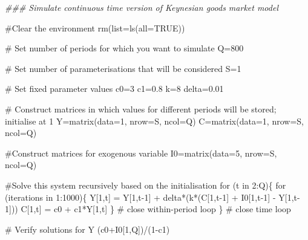 \documentclass[
  letterpaper,
  DIV=11,
  numbers=noendperiod]{scrreprt}
\newenvironment{Shaded}{\begin{snugshade}}{\end{snugshade}}
\newcommand{\AttributeTok}[1]{\textcolor[rgb]{0.40,0.45,0.13}{#1}}
\newcommand{\CommentTok}[1]{\textcolor[rgb]{0.37,0.37,0.37}{#1}}
\newcommand{\ConstantTok}[1]{\textcolor[rgb]{0.56,0.35,0.01}{#1}}
\newcommand{\ControlFlowTok}[1]{\textcolor[rgb]{0.00,0.23,0.31}{#1}}
\newcommand{\DecValTok}[1]{\textcolor[rgb]{0.68,0.00,0.00}{#1}}
\newcommand{\DocumentationTok}[1]{\textcolor[rgb]{0.37,0.37,0.37}{\textit{#1}}}
\newcommand{\FloatTok}[1]{\textcolor[rgb]{0.68,0.00,0.00}{#1}}
\newcommand{\FunctionTok}[1]{\textcolor[rgb]{0.28,0.35,0.67}{#1}}
\newcommand{\NormalTok}[1]{\textcolor[rgb]{0.00,0.23,0.31}{#1}}
\newcommand{\OtherTok}[1]{\textcolor[rgb]{0.00,0.23,0.31}{#1}}
\newcommand{\SpecialCharTok}[1]{\textcolor[rgb]{0.37,0.37,0.37}{#1}}
\begin{document}
\begin{Shaded}
\begin{Highlighting}[]
\DocumentationTok{\#\#\# Simulate continuous time version of Keynesian goods market model}

\CommentTok{\#Clear the environment }
\FunctionTok{rm}\NormalTok{(}\AttributeTok{list=}\FunctionTok{ls}\NormalTok{(}\AttributeTok{all=}\ConstantTok{TRUE}\NormalTok{))}

\CommentTok{\# Set number of periods for which you want to simulate}
\NormalTok{Q}\OtherTok{=}\DecValTok{800}

\CommentTok{\# Set number of parameterisations that will be considered}
\NormalTok{S}\OtherTok{=}\DecValTok{1}

\CommentTok{\# Set fixed parameter values}
\NormalTok{c0}\OtherTok{=}\DecValTok{3}
\NormalTok{c1}\OtherTok{=}\FloatTok{0.8}
\NormalTok{k}\OtherTok{=}\DecValTok{8}
\NormalTok{delta}\OtherTok{=}\FloatTok{0.01}

\CommentTok{\# Construct matrices in which values for different periods will be stored; initialise at 1}
\NormalTok{Y}\OtherTok{=}\FunctionTok{matrix}\NormalTok{(}\AttributeTok{data=}\DecValTok{1}\NormalTok{, }\AttributeTok{nrow=}\NormalTok{S, }\AttributeTok{ncol=}\NormalTok{Q)}
\NormalTok{C}\OtherTok{=}\FunctionTok{matrix}\NormalTok{(}\AttributeTok{data=}\DecValTok{1}\NormalTok{, }\AttributeTok{nrow=}\NormalTok{S, }\AttributeTok{ncol=}\NormalTok{Q)}

\CommentTok{\#Construct matrices for exogenous variable }
\NormalTok{I0}\OtherTok{=}\FunctionTok{matrix}\NormalTok{(}\AttributeTok{data=}\DecValTok{5}\NormalTok{, }\AttributeTok{nrow=}\NormalTok{S, }\AttributeTok{ncol=}\NormalTok{Q)}

\CommentTok{\#Solve this system recursively based on the initialisation}
  \ControlFlowTok{for}\NormalTok{ (t }\ControlFlowTok{in} \DecValTok{2}\SpecialCharTok{:}\NormalTok{Q)\{}
    \ControlFlowTok{for}\NormalTok{ (iterations }\ControlFlowTok{in} \DecValTok{1}\SpecialCharTok{:}\DecValTok{1000}\NormalTok{)\{}
\NormalTok{    Y[}\DecValTok{1}\NormalTok{,t] }\OtherTok{=}\NormalTok{ Y[}\DecValTok{1}\NormalTok{,t}\DecValTok{{-}1}\NormalTok{] }\SpecialCharTok{+}\NormalTok{ delta}\SpecialCharTok{*}\NormalTok{(k}\SpecialCharTok{*}\NormalTok{(C[}\DecValTok{1}\NormalTok{,t}\DecValTok{{-}1}\NormalTok{] }\SpecialCharTok{+}\NormalTok{ I0[}\DecValTok{1}\NormalTok{,t}\DecValTok{{-}1}\NormalTok{] }\SpecialCharTok{{-}}\NormalTok{ Y[}\DecValTok{1}\NormalTok{,t}\DecValTok{{-}1}\NormalTok{]))}
\NormalTok{    C[}\DecValTok{1}\NormalTok{,t] }\OtherTok{=}\NormalTok{ c0 }\SpecialCharTok{+}\NormalTok{ c1}\SpecialCharTok{*}\NormalTok{Y[}\DecValTok{1}\NormalTok{,t]}
\NormalTok{    \} }\CommentTok{\# close within{-}period loop}
\NormalTok{  \} }\CommentTok{\# close time loop}


\CommentTok{\# Verify solutions for Y}
\NormalTok{(c0}\SpecialCharTok{+}\NormalTok{I0[}\DecValTok{1}\NormalTok{,Q])}\SpecialCharTok{/}\NormalTok{(}\DecValTok{1}\SpecialCharTok{{-}}\NormalTok{c1)}
\end{Highlighting}
\end{Shaded}
\end{document}
